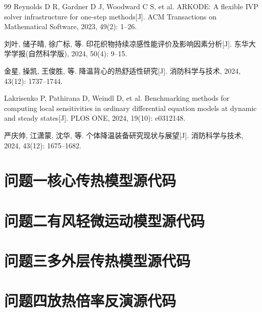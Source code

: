 \documentclass[withoutpreface,bwprint]{cumcmthesis}
\begin{document}
\begin{thebibliography}{99}
    Reynolds D R, Gardner D J, Woodward C S, et al. ARKODE: A flexible IVP solver
    infrastructure for one-step methods[J]. ACM Transactions on Mathematical Software,
    2023, 49(2): 1--26. 

    刘叶, 储子晴, 徐广标, 等. 印花织物持续凉感性能评价及影响因素分析[J].
    东华大学学报(自然科学版), 2024, 50(4): 9--15.

    金星, 操凯, 王俊胜, 等. 降温背心的热舒适性研究[J].
    消防科学与技术, 2024, 43(12): 1737--1744.

    Lakrisenko P, Pathirana D, Weindl D, et al. Benchmarking methods for computing local
    sensitivities in ordinary differential equation models at dynamic and steady states[J].
    PLOS ONE, 2024, 19(10): e0312148.

    严庆帅, 江潇蒙, 沈华, 等. 个体降温装备研究现状与展望[J].
    消防科学与技术, 2024, 43(12): 1675--1682.

\end{thebibliography}



\newpage
\begin{appendices}

\section{问题一核心传热模型源代码}


\section{问题二有风轻微运动模型源代码}


\section{问题三多外层传热模型源代码}


\section{问题四放热倍率反演源代码}

\end{appendices}
\end{document}
